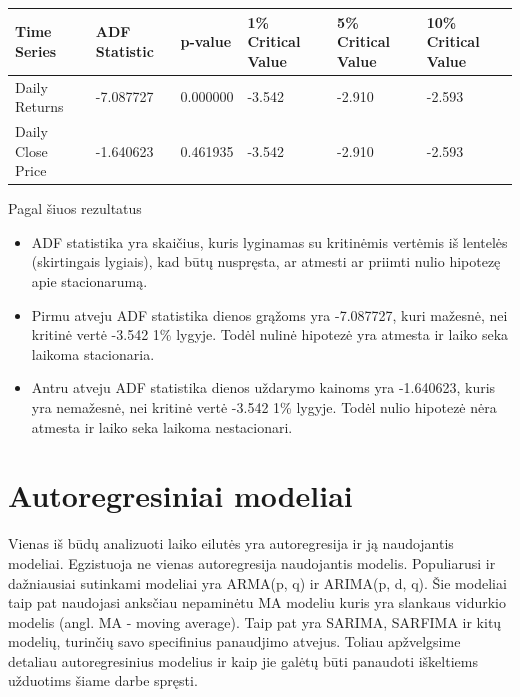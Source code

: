 \documentclass{VUMIFInfKursinis}
\begin{document}
\begin{tabularx}{\linewidth}{|X|X|X|X|X|X|}
  \hline
  \textbf{Time Series} & \textbf{ADF Statistic} & \textbf{p-value} & \textbf{1\% Critical Value} & \textbf{5\% Critical Value} & \textbf{10\% Critical Value} \\ \hline
  Daily Returns        & -7.087727              & 0.000000         & -3.542                      & -2.910                      & -2.593                       \\ \hline
  Daily Close Price    & -1.640623              & 0.461935         & -3.542                      & -2.910                      & -2.593                       \\ \hline
\end{tabularx}

\vspace{10pt}
Pagal šiuos rezultatus
\begin{itemize}
  \item ADF statistika yra skaičius, kuris lyginamas su kritinėmis vertėmis iš lentelės (skirtingais lygiais), kad būtų nuspręsta, ar atmesti ar priimti nulio hipotezę apie stacionarumą.
  \item Pirmu atveju ADF statistika dienos grąžoms yra -7.087727, kuri mažesnė, nei kritinė vertė -3.542 1\% lygyje. Todėl nulinė hipotezė yra atmesta ir laiko seka laikoma stacionaria.
  \item Antru atveju ADF statistika dienos uždarymo kainoms yra -1.640623, kuris yra nemažesnė, nei kritinė vertė -3.542 1\% lygyje. Todėl nulio hipotezė nėra atmesta ir laiko seka laikoma nestacionari.
\end{itemize}

\section{Autoregresiniai modeliai}
Vienas iš būdų analizuoti laiko eilutės yra autoregresija ir ją naudojantis modeliai. Egzistuoja ne vienas autoregresija naudojantis modelis. 
Populiarusi ir dažniausiai sutinkami modeliai yra ARMA(p, q) ir ARIMA(p, d, q).
Šie modeliai taip pat naudojasi anksčiau nepaminėtu MA modeliu kuris yra slankaus vidurkio modelis (angl. MA - moving average).
Taip pat yra SARIMA, SARFIMA ir kitų modelių, turinčių savo specifinius panaudjimo atvejus. 
Toliau apžvelgsime detaliau autoregresinius modelius ir kaip jie galėtų būti panaudoti iškeltiems užduotims šiame darbe spręsti.
\end{document}
